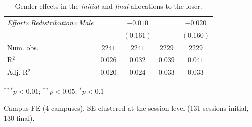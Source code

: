\begin{table}[htpb]
\begin{center}
\begin{footnotesize}
\begin{threeparttable}
\begin{tabular}{l c c c c}
\textit{Effort}$\times$\textit{Redistribution}$\times$\textit{Male} &                & $-0.010$       &               & $-0.020$      \\
                                                                    &                & $(0.161)$      &               & $(0.160)$     \\
\midrule
Num. obs.                                                           & $2241$         & $2241$         & $2229$        & $2229$        \\
R$^2$                                                               & $0.026$        & $0.032$        & $0.039$       & $0.041$       \\
Adj. R$^2$                                                          & $0.020$        & $0.024$        & $0.033$       & $0.033$       \\
\bottomrule
\end{tabular}
\begin{tablenotes}[flushleft]
\footnotesize{\item $^{***}p<0.01$; $^{**}p<0.05$; $^{*}p<0.1$ \item Campus FE (4 campuses). SE clustered at the session level (131 sessions initial, 130 final).}
\end{tablenotes}
\end{threeparttable}
\end{footnotesize}
\caption{Gender effects in the \textit{initial} and \textit{final} allocations to the loser.}
\label{regtreatmentGender}
\end{center}
\end{table}


